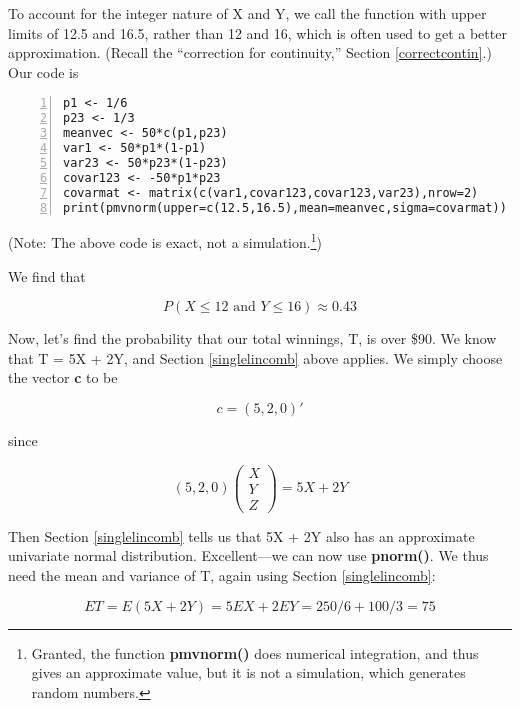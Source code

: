 To account for the integer nature of X and Y, we call the function with
upper limits of 12.5 and 16.5, rather than 12 and 16, which is often
used to get a better approximation.  (Recall the ``correction for
continuity,'' Section \ref{correctcontin}.) Our code is

\begin{Verbatim}[fontsize=\relsize{-2},numbers=left]
p1 <- 1/6
p23 <- 1/3
meanvec <- 50*c(p1,p23)
var1 <- 50*p1*(1-p1)
var23 <- 50*p23*(1-p23)
covar123 <- -50*p1*p23
covarmat <- matrix(c(var1,covar123,covar123,var23),nrow=2)
print(pmvnorm(upper=c(12.5,16.5),mean=meanvec,sigma=covarmat))
\end{Verbatim}

(Note:  The above code is exact, not a simulation.\footnote{Granted, the
function {\bf pmvnorm()} does numerical integration, and thus gives an
approximate value, but it is not a simulation, which generates random
numbers.})

We find that 

\begin{equation}
P(X \leq 12 \textrm{ and } Y \leq 16) \approx 0.43
\end{equation}

Now, let's find the probability that our total winnings, T, is over
\$90.  We know that T = 5X + 2Y, and Section \ref{singlelincomb} above
applies.  We simply choose the vector {\bf c} to be

\begin{equation}
c = (5,2,0)'
\end{equation}

since

\begin{equation}
(5,2,0) 
\left (
\begin{array}{c}
X \\
Y \\
Z 
\end{array}
\right )
=  5X + 2Y
\end{equation}

Then Section \ref{singlelincomb} tells us that 5X + 2Y also has an
approximate univariate normal distribution.  Excellent---we can now use
{\bf pnorm()}.  We thus need the mean and variance of T, again using
Section \ref{singlelincomb}:

\begin{equation}
ET = E(5X+2Y) = 5 EX + 2 EY = 250/6 + 100/3 = 75
\end{equation}

